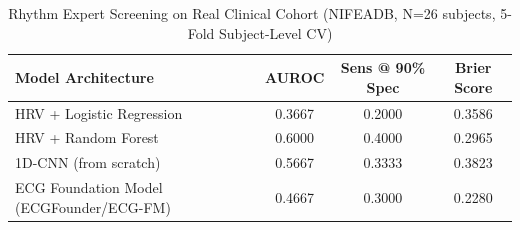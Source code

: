 \begin{table}[t]
\centering
\caption{Rhythm Expert Screening on Real Clinical Cohort (NIFEADB, N=26 subjects, 5-Fold Subject-Level CV)}
\label{tab:rhythm_benchmarks}
\begin{tabular}{lccc}
\toprule
\textbf{Model Architecture} & \textbf{AUROC} & \textbf{Sens @ 90\% Spec} & \textbf{Brier Score} \\
\midrule
HRV + Logistic Regression & 0.3667 & 0.2000 & 0.3586 \\
HRV + Random Forest & 0.6000 & 0.4000 & 0.2965 \\
1D-CNN (from scratch) & 0.5667 & 0.3333 & 0.3823 \\
ECG Foundation Model (ECGFounder/ECG-FM) & 0.4667 & 0.3000 & 0.2280 \\
\bottomrule
\end{tabular}
\end{table}